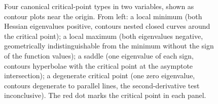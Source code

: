 \begin{figure}[htbp]
\caption[Critical points classified by the Hessian
eigenvalues.]{Four canonical critical-point types in two variables,
shown as contour plots near the origin. From left: a local minimum
(both Hessian eigenvalues positive, contours nested closed curves
around the critical point); a local maximum (both eigenvalues
negative, geometrically indistinguishable from the minimum without
the sign of the function values); a saddle (one eigenvalue of each
sign, contours hyperbolae with the critical point at the asymptote
intersection); a degenerate critical point (one zero eigenvalue,
contours degenerate to parallel lines, the second-derivative test
inconclusive). The red dot marks the critical point in each panel.}
\label{fig:vol02:ch11:critical-classification}
\end{figure}
